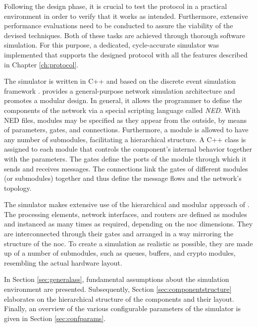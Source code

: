 Following the design phase, it is crucial to test the protocol in a practical environment in order to verify that it works as intended. Furthermore,
extensive performance evaluations need to be conducted to assure the viability of the devised techniques. Both of these tasks are achieved through
thorough software simulation. For this purpose, a dedicated, cycle-accurate simulator was implemented that supports the designed protocol with all the
features described in Chapter \ref{ch:protocol}.

The simulator is written in C++ and based on the \textit{\omnet{}} discrete event simulation framework \cite{omnet}. \omnet{} provides a general-purpose
network simulation architecture and promotes a modular design. In general, it allows the programmer to define the components of the network via a
special scripting language called \textit{NED}. With NED files, modules may be specified as they appear from the outside, by means of parameters,
gates, and connections. Furthermore, a module is allowed to have any number of submodules, facilitating a hierarchical structure. A C++
class is assigned to each module that controls the component's internal behavior together with the parameters. The gates define the ports of the
module through which it sends and receives messages. The connections link the gates of different modules (or submodules) together and thus define the
message flows and the network's topology.

The simulator makes extensive use of the hierarchical and modular approach of \omnet{}. The processing elements, network interfaces, and routers are
defined as modules and instanced as many times as required, depending on the \gls{noc} dimensions. They are interconnected through their gates and
arranged in a way mirroring the structure of the \gls{noc}. To create a simulation as realistic as possible, they are made up of a number of
submodules, such as queues, buffers, and crypto modules, resembling the actual hardware layout.


In Section \ref{sec:generalass}, fundamental assumptions about the simulation environment are presented. Subsequently, Section
\ref{sec:componentstructure} elaborates on the hierarchical structure of the components and their layout. Finally, an overview of the various
configurable parameters of the simulator is given in Section \ref{sec:confparams}.

